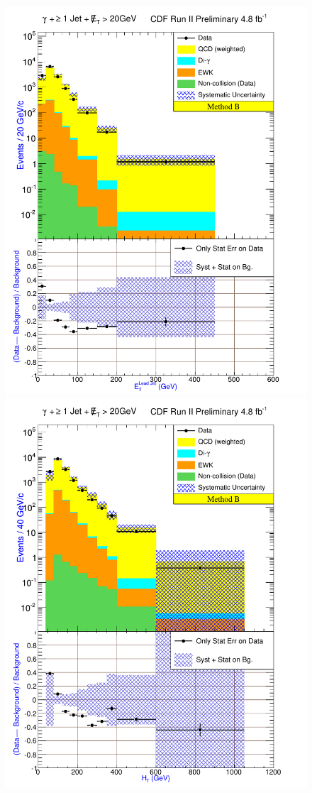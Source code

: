 \documentclass[12pt,twoside,letterpaper,doublespace]{article}
\begin{document}
\begin{figure}[h!]
{\includegraphics[keepaspectratio=true, scale=\figScale]{G30JetsMet20_MtdB_plot1_Et_j1.pdf}}
{\includegraphics[keepaspectratio=true, scale=\figScale]{G30JetsMet20_MtdB_plot1_Ht.pdf}}

\end{figure}
\end{document}
